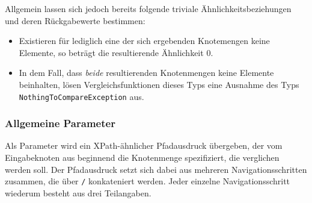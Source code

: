 Allgemein lassen sich jedoch bereits folgende triviale Ähnlichkeitsbeziehungen und deren Rückgabewerte bestimmen:
\begin{itemize}
	\item Existieren für lediglich eine der sich ergebenden Knotemengen keine Elemente, so beträgt die resultierende Ähnlichkeit $0$.
	\item In dem Fall, dass \emph{beide} resultierenden Knotenmengen keine Elemente beinhalten, lösen Vergleichsfunktionen dieses Typs eine Ausnahme des Typs \texttt{NothingToCompareException} aus.
\end{itemize}

\subsubsection*{Allgemeine Parameter}
Als Parameter wird ein XPath-ähnlicher Pfadausdruck übergeben, der vom Eingabeknoten aus beginnend die Knotenmenge spezifiziert, die verglichen werden soll. Der Pfadausdruck setzt sich dabei aus mehreren Navigationsschritten zusammen, die über \texttt{/} konkateniert werden. Jeder einzelne Navigationsschritt wiederum besteht aus drei Teilangaben.
